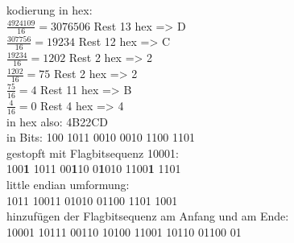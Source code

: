 \documentclass[12pt,a4paper,headsepline]{scrreprt}
\begin{document}
kodierung in hex:\\
$\frac{4924109}{16} = 3076506$ Rest 13 hex => D\\
$\frac{307756}{16} = 19234$ Rest 12 hex => C\\
$\frac{19234}{16} = 1202$ Rest 2 hex => 2\\
$\frac{1202}{16} = 75$ Rest 2 hex => 2\\
$\frac{75}{16} = 4$ Rest 11 hex => B\\
$\frac{4}{16} = 0$ Rest 4 hex => 4\\


in hex also: 4B22CD\\
in Bits: 100 1011 0010 0010 1100 1101\\


gestopft mit Flagbitsequenz 10001:\\
100\textbf{1} 1011 00\textbf{1}10 0\textbf{1}010 1100\textbf{1} 1101\\

little endian umformung:\\
1011 10011 01010 01100 1101 1001\\

hinzufügen der Flagbitsequenz am Anfang und am Ende:\\
10001 10111 00110 10100 11001 10110 01100 01
\end{document}
